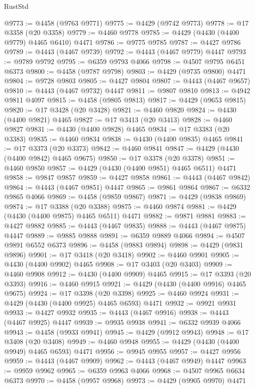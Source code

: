\begin{lexlean}{RustStd}
\begin{coremodule}
{\begin{coremodule}
{{{{{{{{{{{{{{{{{{{{{{{{{{{{{{{{{{{{{{{{{{{{{{{{{{{{{{{{{{{{{{{{{{{{@9773 := @4458 (@9763 @9771)
@9775 := @4429 (@9742 @9773)
@9778 := @17 @3358 (@20 @3358)
@9779 := @4460 @9778
@9785 := @4429 (@4430 (@4400 @9779) @4465 @6410) @4471
@9786 := @9775 @9785
@9787 := @4427 @9786
@9789 := @4443 (@4467 @9739)
@9792 := @4443 (@4467 @9779) @4447
@9793 := @9789 @9792
@9795 := @6359 @9793 @4066
@9798 := @4507 @9795 @6451 @6373
@9800 := @4458 (@9787 @9798)
@9803 := @4429 (@9735 @9800) @4471
@9804 := @9728 @9803
@9805 := @4427 @9804
@9807 := @4443 (@4467 @9657)
@9810 := @4443 (@4467 @9732) @4447
@9811 := @9807 @9810
@9813 := @4942 @9811 @4097
@9815 := @4458 (@9805 @9813)
@9817 := @4429 (@9653 @9815)
@9820 := @17 @3428 (@20 @3428)
@9821 := @4460 @9820
@9824 := @4430 (@4400 @9821) @4465
@9827 := @17 @3413 (@20 @3413)
@9828 := @4460 @9827
@9831 := @4430 (@4400 @9828) @4465
@9834 := @17 @3383 (@20 @3383)
@9835 := @4460 @9834
@9838 := @4430 (@4400 @9835) @4465
@9841 := @17 @3373 (@20 @3373)
@9842 := @4460 @9841
@9847 := @4429 (@4430 (@4400 @9842) @4465 @9675)
@9850 := @17 @3378 (@20 @3378)
@9851 := @4460 @9850
@9857 := @4429 (@4430 (@4400 @9851) @4465 @6511) @4471
@9858 := @9847 @9857
@9859 := @4427 @9858
@9861 := @4443 (@4467 @9842)
@9864 := @4443 (@4467 @9851) @4447
@9865 := @9861 @9864
@9867 := @6332 @9865 @4066
@9869 := @4458 (@9859 @9867)
@9871 := @4429 (@9838 @9869)
@9874 := @17 @3388 (@20 @3388)
@9875 := @4460 @9874
@9881 := @4429 (@4430 (@4400 @9875) @4465 @6511) @4471
@9882 := @9871 @9881
@9883 := @4427 @9882
@9885 := @4443 (@4467 @9835)
@9888 := @4443 (@4467 @9875) @4447
@9889 := @9885 @9888
@9891 := @6359 @9889 @4066
@9894 := @4507 @9891 @6552 @6373
@9896 := @4458 (@9883 @9894)
@9898 := @4429 (@9831 @9896)
@9901 := @17 @3418 (@20 @3418)
@9902 := @4460 @9901
@9905 := @4430 (@4400 @9902) @4465
@9908 := @17 @3403 (@20 @3403)
@9909 := @4460 @9908
@9912 := @4430 (@4400 @9909) @4465
@9915 := @17 @3393 (@20 @3393)
@9916 := @4460 @9915
@9921 := @4429 (@4430 (@4400 @9916) @4465 @9675)
@9924 := @17 @3398 (@20 @3398)
@9925 := @4460 @9924
@9931 := @4429 (@4430 (@4400 @9925) @4465 @6593) @4471
@9932 := @9921 @9931
@9933 := @4427 @9932
@9935 := @4443 (@4467 @9916)
@9938 := @4443 (@4467 @9925) @4447
@9939 := @9935 @9938
@9941 := @6332 @9939 @4066
@9943 := @4458 (@9933 @9941)
@9945 := @4429 (@9912 @9943)
@9948 := @17 @3408 (@20 @3408)
@9949 := @4460 @9948
@9955 := @4429 (@4430 (@4400 @9949) @4465 @6593) @4471
@9956 := @9945 @9955
@9957 := @4427 @9956
@9959 := @4443 (@4467 @9909)
@9962 := @4443 (@4467 @9949) @4447
@9963 := @9959 @9962
@9965 := @6359 @9963 @4066
@9968 := @4507 @9965 @6634 @6373
@9970 := @4458 (@9957 @9968)
@9973 := @4429 (@9905 @9970) @4471
}}}}}}}}}}}}}}}}}}}}}}}}}}}}}}}}}}}}}}}}}}}}}}}}}}}}}}}}}}}}}}}}}}}}
\end{coremodule}}
\end{coremodule}
\end{lexlean}
